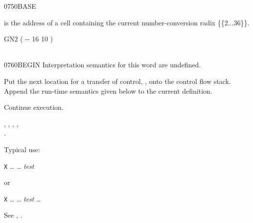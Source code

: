 \vspace*{-1ex}
\begin{worddef}{0750}{BASE}
\item {}

	 is the address of a cell containing the current
	number-conversion radix \{\{2...36\}\}.

	\begin{testing} %
		\ttfamily
		\word{:} GN2	 ( -{}- 16 10 ) \\
		\tab {}  
			  
			  
			  \word{!} \word{;} \\
	\end{testing}
\end{worddef}

\vspace*{-1ex}
\enlargethispage{8ex}
\begin{worddef}{0760}{BEGIN}
\interpret
	Interpretation semantics for this word are undefined.

\compile

	Put the next location for a transfer of control, , onto
	the control flow stack. Append the run-time semantics given below
	to the current definition.

\runtime
	\stack{}{}

	Continue execution.

\see {},
	,
	,
	, \\
	.

	\begin{rationale} %
		Typical use:

		\tab \word{:} \texttt{X} {\ldots}
			 {\ldots} \emph{test} 
		\word{;}

		or

		\tab \word{:} \texttt{X} {\ldots}
			 {\ldots}
			\emph{test}  {\ldots}
		\word{;}
	\end{rationale}

	\begin{testing} %
		See ,
			.
	\end{testing}
\end{worddef}


